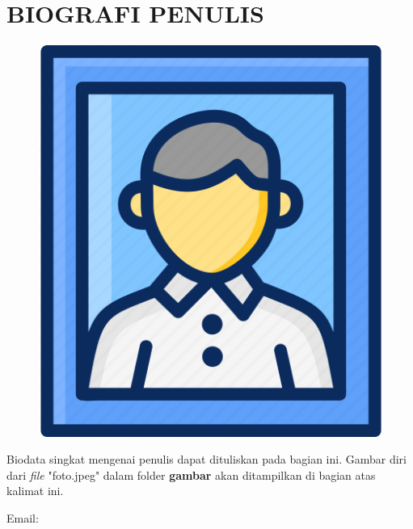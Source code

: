 \renewcommand{\thechapter}{\Roman{chapter}}
\chapter*{BIOGRAFI PENULIS}
\renewcommand{\thechapter}{\arabic{chapter}}

\begin{figure}
  \begin{center}
    \vspace{-20pt} %
    \includegraphics[width=.30\textwidth]{./gambar/foto.png}
    \vspace{-20pt} %
  \end{center}
\end{figure}

\noindent Biodata singkat mengenai penulis dapat dituliskan pada bagian ini. Gambar diri dari \textit{file} "foto.jpeg" dalam folder  \textbf{gambar} akan ditampilkan di bagian atas kalimat ini. \lipsum[1-2]
 
\vspace{7pt}
\noindent Email: \emailMahasiswa

